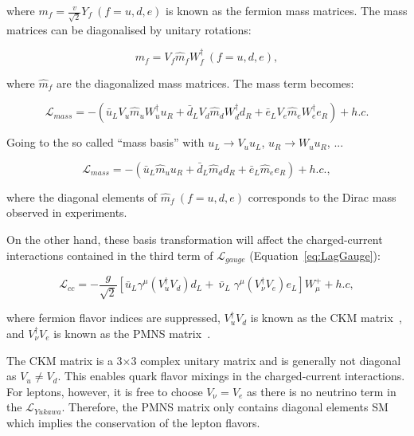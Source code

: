 where $m_f=\frac{v}{\sqrt{2}}Y_{f}~(f=u,d,e)$ is known as the fermion mass matrices. The mass matrices can be diagonalised by unitary rotations:

\begin{equation}
m_{f}=V_{f}\hat{m}_{f}W^{\dagger}_{f}~(f=u,d,e),
\end{equation}

where $\hat{m}_{f}$ are the diagonalized mass matrices. The mass term becomes:

\begin{equation}
\mathcal{L}_{mass}=-(\bar{u}_{L}V_{u}\hat{m}_{u}W_{u}^{\dagger}u_{R}+\bar{d}_{L}V_{d}\hat{m}_{d}W^{\dagger}_{d}d_{R}+\bar{e}_{L}V_{e}\hat{m}_{e}W_{e}^{\dagger}e_{R}) + h.c.
\end{equation}

Going to the so called ``mass basis'' with $u_{L}\rightarrow V_{u}u_{L}$, $u_{R}\rightarrow W_{u}u_{R}$, ...

\begin{equation}
\mathcal{L}_{mass}=-(\bar{u}_{L}\hat{m}_{u}u_{R}+\bar{d}_{L}\hat{m}_{d}d_{R}+\bar{e}_{L}\hat{m}_{e}e_{R}) + h.c.,
\end{equation}

where the diagonal elements of $\hat{m}_{f}~(f=u,d,e)$ corresponds to the Dirac mass observed in experiments. 

On the other hand, these basis transformation will affect the charged-current interactions contained in the third term of $\mathcal{L}_{gauge}$ (Equation~\ref{eq:LagGauge}):

\begin{equation}
\mathcal{L}_{cc}=-\frac{g}{\sqrt{2}}[\bar{u}_{L}\gamma^{\mu}(V_{u}^{\dagger}V_{d})d_{L}+\bar{\upnu}_{L}\gamma^{\mu}(V_{\nu}^{\dagger}V_{e})e_{L}]W_{\mu}^{+} + h.c, 
\end{equation}

where fermion flavor indices are suppressed, $V_{u}^{\dagger}V_{d}$ is known as the \ac{CKM} matrix~\cite{Cabibbo:1963yz,Kobayashi:1973fv}, and $V_{\nu}^{\dagger}V_{e}$ is known as the \ac{PMNS} matrix~\cite{Pontecorvo:1957cp,Maki:1962mu}. 

The \ac{CKM} matrix is a 3$\times$3 complex unitary matrix and is generally not diagonal as $V_{u}\neq V_{d}$. This enables quark flavor mixings in the charged-current interactions. For leptons, however, it is free to choose $V_{\upnu}=V_{e}$ as there is no neutrino term in the $\mathcal{L}_{Yukawa}$. Therefore, the \ac{PMNS} matrix only contains diagonal elements \ac{SM} which implies the conservation of the lepton flavors.   

